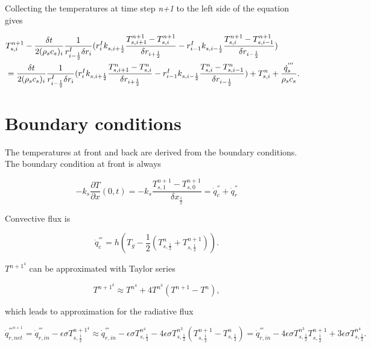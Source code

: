 Collecting the temperatures at time step \textit{n+1} to the left side of the equation gives

 \begin{eqnarray}
\label{crank-nicolson_2}
  \lefteqn{T_{s,i}^{n+1}-\frac{\delta t}{2(\rho_s c_s)_i}\frac{1}{r_{i-\frac{1}{2}}^I \delta r_i}(r_{i}^{I}k_{s,i+\frac{1}{2}}\frac{T_{s,i+1}^{n+1}-T_{s,i}^{n+1}}{\delta r_{i+\frac{1}{2}}}-r_{i-1}^{I}k_{s,i-\frac{1}{2}}\frac{T_{s,i}^{n+1}-T_{s,i-1}^{n+1}}{\delta r_{i-\frac{1}{2}}})}\nonumber\\
 & =\frac{\delta t}{2(\rho_s c_s)_i}\frac{1}{r_{i-\frac{1}{2}}^I \delta r_i}(r_{i}^{I}k_{s,i+\frac{1}{2}}\frac{T_{s,i+1}^{n}-T_{s,i}^{n}}{\delta r_{i+\frac{1}{2}}}-r_{i-1}^{I}k_{s,i-\frac{1}{2}}\frac{T_{s,i}^{n}-T_{s,i-1}^{n}}{\delta r_{i-\frac{1}{2}}})+T_{s,i}^{n}+\frac{\dot{q}^{'''}_s}{\rho_s c_s}.\nonumber\\
\end{eqnarray}

\section{Boundary conditions}
The temperatures at front and back are derived from the boundary conditions. The boundary condition at front is always

\begin{equation}
\label{bc_front}
  -k_s \frac{\partial T}{\partial x} (0,t)
  = -k_s \frac{T_{s,1}^{n+1}-T_{s,0}^{n+1}}{\delta x_{\frac{1}{2}}}
  =  \dot{q}_{c}^{''}+\dot{q}_{r}^{''}
\end{equation}

Convective flux is

\begin{equation}
\label{conv}
  \dot{q}_c^{'''} = h(T_g - \frac{1}{2}(T_{s,\frac{1}{2}}^n+T_{s,\frac{1}{2}}^{n+1})).
\end{equation}

$T^{n+1^{4}}$ can be approximated with Taylor series

\begin{equation}
\label{T_taylor}
  T^{n+1^4} \approx T^{n^4} + 4T^{n^3}(T^{n+1}-T^n),
\end{equation}

which leads to approximation for the radiative flux

\begin{equation}
\label{radi}
  \dot{q}_{r,net}^{'''^{n+1}}
  = \dot{q}_{r, in}^{'''} - \epsilon\sigma T_{s,\frac{1}{2}}^{n+1^4}
  \approx \dot{q}_{r, in}^{'''} - \epsilon\sigma T_{s,\frac{1}{2}}^{n^4} - 4\epsilon\sigma T_{s,\frac{1}{2}}^{n^3}(T_{s,\frac{1}{2}}^{n+1}-T_{s,\frac{1}{2}}^n)
  = \dot{q}_{r, in}^{'''}-4\epsilon\sigma T_{s,\frac{1}{2}}^{n^3}T_{s,\frac{1}{2}}^{n+1} + 3\epsilon\sigma T_{s,\frac{1}{2}}^{n^4}.
\end{equation}

